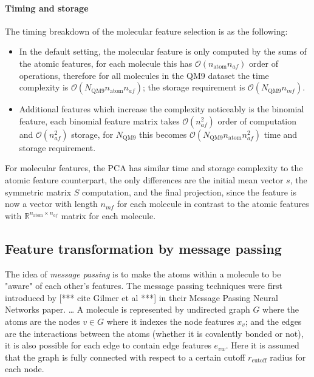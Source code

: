 \documentclass[12pt]{article}
\def\att{                    %
        \marginpar[ \hspace*{\fill} \raisebox{-0.2em}{\rule{2mm}{1.2em}} ]
        {\raisebox{-0.2em}{\rule{2mm}{1.2em}} }
        }
\def\at#1{[*** \att #1 ***]}  %
\begin{document}
\paragraph{Timing and storage}
The timing breakdown of the molecular feature selection is as the following:
\begin{itemize}
	\item In the default setting, the molecular feature is only computed by the sums of the atomic features, for each molecule this has $\mathcal{O}(n_\text{atom} n_{af})$ order of operations, therefore for all molecules in the QM9 dataset the time complexity is $\mathcal{O}(N_\text{QM9}n_\text{atom} n_{af})$; the storage requirement is $\mathcal{O}(N_\text{QM9}n_{mf})$. 
	\item Additional features which increase the complexity noticeably is the binomial feature, each binomial feature matrix takes $\mathcal{O}(n^2_{af})$ order of computation and $\mathcal{O}(n^2_{af})$ storage, for $N_\text{QM9}$ this becomes $\mathcal{O}(N_\text{QM9}n_\text{atom}n^2_{af})$ time and storage requirement.
\end{itemize}
For molecular features, the PCA has similar time and storage complexity to the atomic feature counterpart, the only differences are the initial mean vector $s$, the symmetric matrix $S$ computation, and the final projection, since the feature is now a vector with length $n_{mf}$ for each molecule in contrast to the atomic features with $\mathbb{R}^{n_\text{atom} \times n_{af}}$ matrix for each molecule.

\subsection{Feature transformation by message passing}
The idea of \textit{message passing} is to make the atoms within a molecule to be "aware" of each other's features.  
The message passing techniques were first introduced by \at{cite Gilmer et al} in their Message Passing Neural Networks paper. 
\dots
A molecule is represented by undirected graph $G$ where the atoms are the nodes $v \in G$ where it indexes the node features $x_v$; and the edges are the interactions between the atoms (whether it is covalently bonded or not), it is also possible for each edge to contain edge features $e_{vw}$. Here it is assumed that the graph is fully connected with respect to a certain cutoff $r_\text{cutoff}$ radius for each node.
\end{document}
